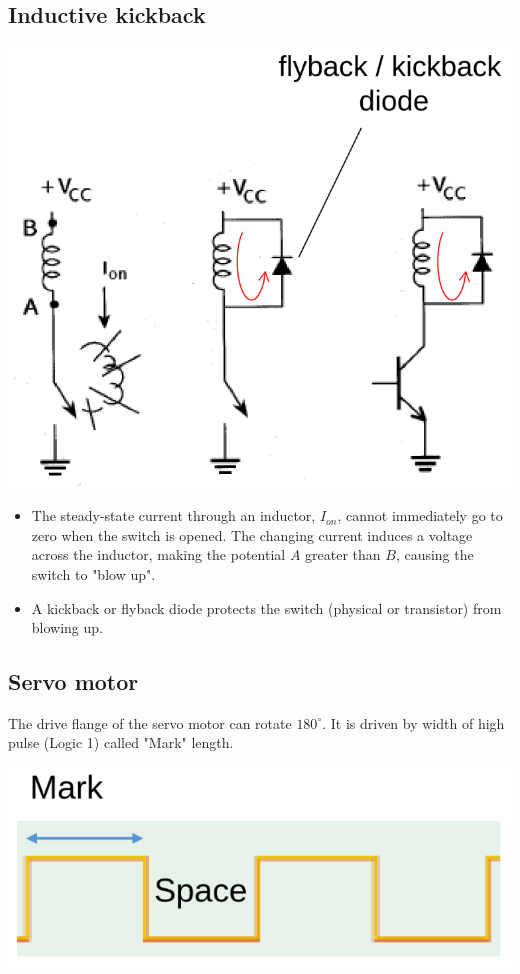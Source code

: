 \documentclass[11pt]{article}
\begin{document}
\subsection{Inductive kickback}
\label{sec:orge3d3247}
\begin{center}
\includegraphics[scale=0.75]{./images/inductive-kickback.png}
\end{center}

\begin{itemize}
\item The steady-state current through an inductor, \(I_{on}\), cannot immediately go to zero when the switch is opened. The changing current induces a voltage across the inductor, making the potential \(A\) greater than \(B\), causing the switch to "blow up".
\item A kickback or flyback diode protects the switch (physical or transistor) from blowing up.
\end{itemize}
\subsection{Servo motor}
\label{sec:orgb4eb6ba}
The drive flange of the servo motor can rotate \(180^{\circ}\). It is driven by width of high pulse (Logic 1) called "Mark" length.

\begin{center}
\includegraphics[scale=0.6]{./images/servo-motor-mark-length.png}
\end{center}
\end{document}
